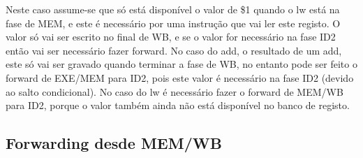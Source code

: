 \documentclass[pdftex,12pt,a4paper]{report}
\begin{document}
\begin{table}[!htb]
\centering
\label{my-label}
\end{table}

Neste caso assume-se que só está disponível o valor de \$1 quando o lw está na fase de MEM, e este é necessário por uma instrução que vai ler este registo. O valor só vai ser escrito no final de WB, e se o valor for necessário na fase ID2 então vai ser necessário fazer forward. No caso do add, o resultado de um add, este só vai ser gravado quando terminar a fase de WB, no entanto pode ser feito o forward de EXE/MEM para ID2, pois este valor é necessário na fase ID2 (devido ao salto condicional). No caso do lw é necessário fazer o forward de MEM/WB para ID2, porque o valor também ainda não está disponível no banco de registo.

\subsection{Forwarding desde MEM/WB}
\end{document}
